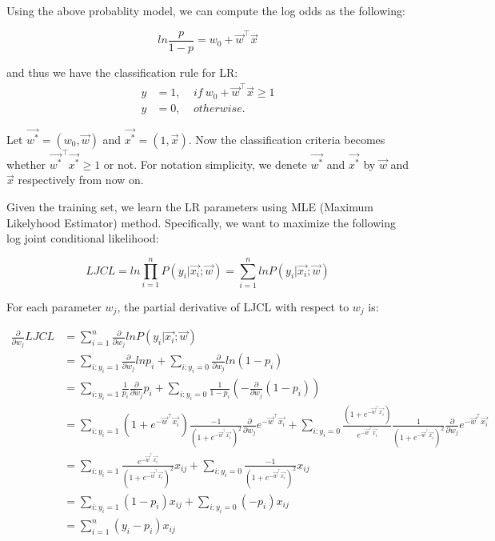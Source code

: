 \documentclass{article} %
\begin{document}
Using the above probablity model, we can compute the log odds as the following:

\begin{equation}
  ln\frac{p}{1-p} = w_0 + \vec{w}^\top\vec{x}
\end{equation}

and thus we have the classification rule for LR:
\begin{align*}
  y &= 1, \ \ \ \ \ if \ w_0 + \vec{w}^\top\vec{x} \geq 1\\
  y &= 0, \ \ \ \ \ otherwise.
\end{align*}

Let $\vec{w^*} = (w_0, \vec{w})$ and $\vec{x^*} = (1, \vec{x})$. Now the classification criteria becomes whether $\vec{w^*}^\top\vec{x^*} \geq 1$ or not. For notation simplicity, we denete $\vec{w^*}$ and $\vec{x^*}$ by $\vec{w}$ and $\vec{x}$ respectively from now on.

Given the training set, we learn the LR parameters using MLE (Maximum Likelyhood Estimator) method. Specifically, we want to maximize the following log joint conditional likelihood:

\begin{equation}
  LJCL = ln\prod\limits_{i=1}^nP(y_i | \vec{x_i}; \vec{w}) = \sum\limits_{i=1}^nlnP(y_i | \vec{x_i}; \vec{w})
\end{equation}

For each parameter $w_j$, the partial derivative of LJCL with respect to $w_j$ is:

\begin{equation}
\begin{split}
  \frac{\partial}{\partial w_j} LJCL &= \sum\limits_{i=1}^n\frac{\partial}{\partial w_j}lnP(y_i | \vec{x_i}; \vec{w})\\
  &= \sum\limits_{i:y_i=1}\frac{\partial}{\partial w_j}lnp_i + \sum\limits_{i:y_i=0}\frac{\partial}{\partial w_j}ln(1-p_i)\\
  &= \sum\limits_{i:y_i=1}\frac{1}{p_i}\frac{\partial}{\partial w_j}p_i + \sum\limits_{i:y_i=0}\frac{1}{1-p_i}(-\frac{\partial}{\partial w_j}(1-p_i))\\
  &= \sum\limits_{i:y_i=1}(1+e^{-\vec{w}^\top\vec{x_i}})\frac{-1}{(1+e^{-\vec{w}^\top\vec{x_i}})^2}\frac{\partial}{\partial w_j}e^{-\vec{w}^\top\vec{x_i}} + \sum\limits_{i:y_i=0}\frac{(1+e^{-\vec{w}^\top\vec{x_i}})}{e^{-\vec{w}^\top\vec{x_i}}}\frac{1}{(1+e^{-\vec{w}^\top\vec{x_i}})^2}\frac{\partial}{\partial w_j}e^{-\vec{w}^\top\vec{x_i}}\\
  &= \sum\limits_{i:y_i=1}\frac{e^{-\vec{w}^\top\vec{x_i}}}{(1+e^{-\vec{w}^\top\vec{x_i}})^2}x_{ij} + \sum\limits_{i:y_i=0}\frac{-1}{(1+e^{-\vec{w}^\top\vec{x_i}})^2}x_{ij}\\
  &= \sum\limits_{i:y_i=1}(1-p_i)x_{ij} + \sum\limits_{i:y_i=0}(-p_i)x_{ij}\\
  &= \sum\limits_{i=1}^n(y_i-p_i)x_{ij}
\end{split}
\end{equation}
\end{document}
